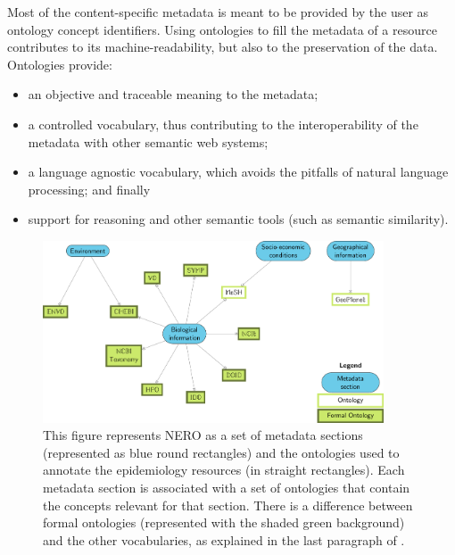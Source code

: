 Most of the content-specific metadata is meant to be provided by the user as ontology concept identifiers. Using ontologies to fill the metadata of a resource contributes to its machine-readability, but also to the preservation of the data. Ontologies provide:
\begin{itemize}
    \item an objective and traceable meaning to the metadata;
    \item a controlled vocabulary, thus contributing to the interoperability of the metadata with other semantic web systems;
    \item a language agnostic vocabulary, which avoids the pitfalls of natural language processing; and finally
    \item support for reasoning and other semantic tools (such as semantic similarity).
\end{itemize}

\begin{figure}
    \centering
    \includegraphics[width=0.9\textwidth]{images/nero.pdf}
    \caption[The Network of Epidemiology-Related Ontologies]{This figure represents NERO as a set of metadata sections (represented as blue round rectangles) and the ontologies used to annotate the epidemiology resources (in straight rectangles). Each metadata section is associated with a set of ontologies that contain the concepts relevant for that section. There is a difference between formal ontologies (represented with the shaded green background) and the other vocabularies, as explained in the last paragraph of .}
    \label{fig:nero}
\end{figure}

